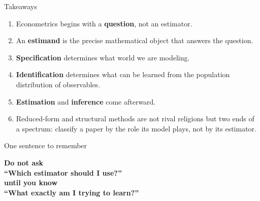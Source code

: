 \documentclass[aspectratio=169,11pt]{beamer}
\begin{document}
\begin{frame}{Takeaways}

\begin{enumerate}
    \item
    Econometrics begins with a \textbf{question}, not an estimator.

    \vspace{0.25em}

    \item
    An \textbf{estimand} is the precise mathematical object that answers
    the question.

    \vspace{0.25em}

    \item
    \textbf{Specification} determines what world we are modeling.

    \vspace{0.25em}

    \item
    \textbf{Identification} determines what can be learned from
    the population distribution of observables.

    \vspace{0.25em}

    \item
    \textbf{Estimation} and \textbf{inference} come afterward.

    \vspace{0.25em}

    \item
    Reduced-form and structural methods are not rival religions but
    two ends of a spectrum: classify a paper by the role its model
    plays, not by its estimator.
\end{enumerate}

\end{frame}

\begin{frame}{One sentence to remember}

\begin{center}

\vspace{0.6em}

\Huge
\textbf{
Do not ask
\\[0.3em]
``Which estimator should I use?''
\\[0.8em]
until you know
\\[0.3em]
``What exactly am I trying to learn?''
}

\end{center}

\end{frame}
\end{document}
